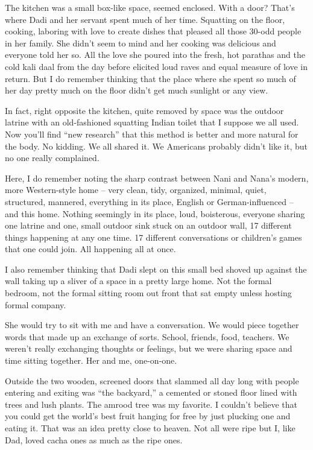 The kitchen was a small box-like space, seemed enclosed. With a door? That’s where Dadi and her servant spent much of her time. Squatting on the floor, cooking, laboring with love to create dishes that pleased all those 30-odd people in her family. She didn’t seem to mind and her cooking was delicious and everyone told her so. All the love she poured into the fresh, hot parathas and the cold kali daal from the day before elicited loud raves and equal measure of love in return. But I do remember thinking that the place where she spent so much of her day pretty much on the floor didn't get much sunlight or any view.

In fact, right opposite the kitchen, quite removed by space was the outdoor latrine with an old-fashioned squatting Indian toilet that I suppose we all used. Now you’ll find “new research” that this method is better and more natural for the body. No kidding. We all shared it. We Americans probably didn’t like it, but no one really complained.

Here, I do remember noting the sharp contrast between Nani and Nana’s modern, more Western-style home – very clean, tidy, organized, minimal, quiet, structured, mannered, everything in its place, English or German-influenced – and this home. Nothing seemingly in its place, loud, boisterous, everyone sharing one latrine and one, small outdoor sink stuck on an outdoor wall, 17 different things happening at any one time. 17 different conversations or children’s games that one could join. All happening all at once.

I also remember thinking that Dadi slept on this small bed shoved up against the wall taking up a sliver of a space in a pretty large home. Not the formal bedroom, not the formal sitting room out front that sat empty unless hosting formal company.

She would try to sit with me and have a conversation. We would piece together words that made up an exchange of sorts. School, friends, food, teachers. We weren’t really exchanging thoughts or feelings, but we were sharing space and time sitting together. Her and me, one-on-one.

Outside the two wooden, screened doors that slammed all day long with people entering and exiting was “the backyard,” a cemented or stoned floor lined with trees and lush plants. The amrood tree was my favorite. I couldn’t believe that you could get the world’s best fruit hanging for free by just plucking one and eating it. That was an idea pretty close to heaven. Not all were ripe but I, like Dad, loved cacha ones as much as the ripe ones.

